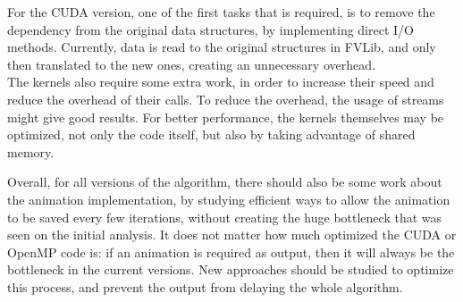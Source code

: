 \documentclass[9pt,twocolumn]{scrartcl}
\begin{document}
For the CUDA version, one of the first tasks that is required, is to remove the dependency from the original data structures, by implementing direct I/O methods. Currently, data is read to the original structures in FVLib, and only then translated to the new ones, creating an unnecessary overhead.\\

The kernels also require some extra work, in order to increase their speed and reduce the overhead of their calls. To reduce the overhead, the usage of streams might give good results. For better performance, the kernels themselves may be optimized, not only the code itself, but also by taking advantage of shared memory.

Overall, for all versions of the algorithm, there should also be some work about the animation implementation, by studying efficient ways to allow the animation to be saved every few iterations, without creating the huge bottleneck that was seen on the initial analysis. It does not matter how much optimized the CUDA or OpenMP code is: if an animation is required as output, then it will always be the bottleneck in the current versions. New approaches should be studied to optimize this process, and prevent the output from delaying the whole algorithm.
\end{document}
